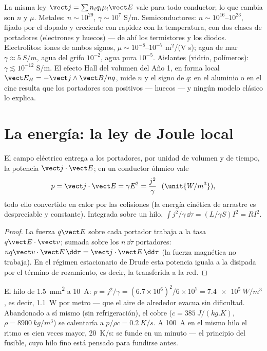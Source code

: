 \begin{remark}\label{rem:b2:charges-currents-conduction:materials}
La misma ley $\vect j = \sum n_iq_i\mu_i\vect E$ vale para todo conductor;
lo que cambia son $n$ y $\mu$. Metales: $n \sim 10^{29}$, $\gamma \sim 10^7$
S/m. Semiconductores: $n \sim 10^{16}$--$10^{23}$, fijado por el dopado y
creciente con rapidez con la temperatura, con dos clases de portadores
(electrones y huecos) --- de ahí los termistores y los diodos.
Electrolitos: iones de ambos signos, $\mu \sim 10^{-8}$--$10^{-7}$ m$^2$/(V s); agua de mar $\gamma \approx \qty{5}{S/m}$,
agua del grifo $10^{-2}$, agua pura $10^{-5}$. Aislantes (vidrio, polímeros):
$\gamma \lesssim 10^{-12}$ S/m. El efecto Hall del volumen del Año 1, en
forma local $\vect E_H = -\vect j\wedge\vect B/nq$, mide $n$ y el signo de
$q$: en el aluminio o en el cinc resulta que los portadores son positivos
--- huecos --- y ningún modelo clásico lo explica.
\end{remark}

\section{La energía: la ley de Joule local}

\begin{proposition}\label{prop:b2:charges-currents-conduction:joule}
El campo eléctrico entrega a los portadores, por unidad de volumen y de
tiempo, la potencia $\vect j\cdot\vect E$; en un conductor óhmico vale
\[
p = \vect j\cdot\vect E = \gamma E^2 = \frac{j^2}\gamma \ \ (\unit{W/m^3}) ,
\]
todo ello convertido en calor por las colisiones (la energía cinética de
arrastre es despreciable y constante). Integrada sobre un hilo, $\int j^2/\gamma\,\dd\tau
= (L/\gamma S)I^2 = RI^2$.
\end{proposition}

\begin{proof}
La fuerza $q\vect E$ sobre cada portador trabaja a la tasa $q\vect E\cdot\vect v$;
sumada sobre los $n\,\dd\tau$ portadores: $nq\vect v\cdot\vect E\,\dd\tau = \vect j\cdot
\vect E\,\dd\tau$ (la fuerza magnética no trabaja). En el régimen
estacionario de Drude esta potencia iguala a la disipada por el término de
rozamiento, es decir, la transferida a la red.
\end{proof}

\begin{example}\label{ex:b2:charges-currents-conduction:heating}
El hilo de \qty{1.5}{mm^2} a \qty{10}{A}: $p = j^2/\gamma = (6.7 \times 10^6)^2/6 \times 10^7 =
\qty{7.4e5}{W/m^3}$, es decir, \qty{1.1}{W} por metro --- que el aire de alrededor
evacua sin dificultad. Abandonado a sí mismo (sin refrigeración), el cobre ($c = \qty{385}{J/(kg.K)}$,
$\rho = \qty{8900}{kg/m^3}$) se calentaría a $p/\rho c = \qty{0.2}{K/s}$. A \qty{100}{A}
en el mismo hilo el ritmo es cien veces mayor, \qty{20}{K/s}: se funde en
un minuto --- el principio del fusible, cuyo hilo fino está pensado para
fundirse antes.
\end{example}

